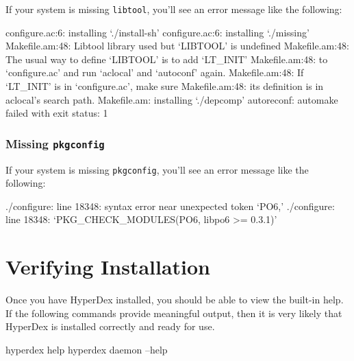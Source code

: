 If your system is missing \texttt{libtool}, you'll see an error message like the
following:

\begin{consolecode}
configure.ac:6: installing `./install-sh'
configure.ac:6: installing `./missing'
Makefile.am:48: Libtool library used but `LIBTOOL' is undefined
Makefile.am:48:   The usual way to define `LIBTOOL' is to add `LT_INIT'
Makefile.am:48:   to `configure.ac' and run `aclocal' and `autoconf' again.
Makefile.am:48:   If `LT_INIT' is in `configure.ac', make sure
Makefile.am:48:   its definition is in aclocal's search path.
Makefile.am: installing `./depcomp'
autoreconf: automake failed with exit status: 1
\end{consolecode}

\subsubsection{Missing \texttt{pkgconfig}}

If your system is missing \texttt{pkgconfig}, you'll see an error message like
the following:

\begin{consolecode}
./configure: line 18348: syntax error near unexpected token `PO6,'
./configure: line 18348: `PKG_CHECK_MODULES(PO6, libpo6 >= 0.3.1)'
\end{consolecode}

\section{Verifying Installation}
\label{sec:installation:verify}

Once you have HyperDex installed, you should be able to view the built-in help.
If the following commands provide meaningful output, then it is very likely that
HyperDex is installed correctly and ready for use.

\begin{consolecode}
hyperdex help
hyperdex daemon --help
\end{consolecode}
